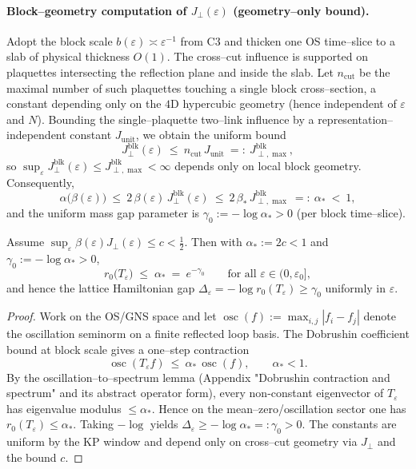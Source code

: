 \documentclass[11pt]{amsart}
\begin{document}
\paragraph{Block–geometry computation of $J_{\perp}(\varepsilon)$ (geometry–only bound).}
Adopt the block scale $b(\varepsilon)\asymp\varepsilon^{-1}$ from C3 and thicken one OS time–slice to a slab of physical thickness $O(1)$. The cross–cut influence is supported on plaquettes intersecting the reflection plane and inside the slab. Let $n_{\mathrm{cut}}$ be the maximal number of such plaquettes touching a single block cross–section, a constant depending only on the $4$D hypercubic geometry (hence independent of $\varepsilon$ and $N$). Bounding the single–plaquette two–link influence by a representation–independent constant $J_{\mathrm{unit}}$, we obtain the uniform bound
\[
  J^{\mathrm{blk}}_{\perp}(\varepsilon)\ \le\ n_{\mathrm{cut}}\,J_{\mathrm{unit}}\ =:\ J^{\mathrm{blk}}_{\perp,\max},
\]
so $\sup_{\varepsilon} J^{\mathrm{blk}}_{\perp}(\varepsilon)\le J^{\mathrm{blk}}_{\perp,\max}<\infty$ depends only on local block geometry. Consequently,
\[
  \alpha\bigl(\beta(\varepsilon)\bigr)\ \le\ 2\,\beta(\varepsilon)\,J^{\mathrm{blk}}_{\perp}(\varepsilon)\ \le\ 2\,\beta_*\,J^{\mathrm{blk}}_{\perp,\max}\ =:\ \alpha_*\ <\ 1,
\]
and the uniform mass gap parameter is $\gamma_0:=-\log \alpha_*>0$ (per block time–slice).

\begin{theorem}
Assume $\sup_{\varepsilon}\beta(\varepsilon) J_{\perp}(\varepsilon)\le c<\tfrac12$. Then with $\alpha_*:=2c<1$ and $\gamma_0:=-\log\alpha_*>0$,
\[
  r_0\bigl(T_{\varepsilon}\bigr)\;\le\;\alpha_*\ =\ e^{-\gamma_0}\qquad\text{for all }\varepsilon\in(0,\varepsilon_0],
\]
and hence the lattice Hamiltonian gap $\Delta_{\varepsilon}=-\log r_0(T_{\varepsilon})\ge \gamma_0$ uniformly in $\varepsilon$.
\end{theorem}

\begin{proof}[Proof]
Work on the OS/GNS space and let $\operatorname{osc}(f):=\max_{i,j}|f_i-f_j|$ denote the oscillation seminorm on a finite reflected loop basis. The Dobrushin coefficient bound at block scale gives a one–step contraction
\[
  \operatorname{osc}(T_{\varepsilon} f)\ \le\ \alpha_*\,\operatorname{osc}(f),\qquad \alpha_*<1.
\]
By the oscillation–to–spectrum lemma (Appendix "Dobrushin contraction and spectrum" and its abstract operator form), every non-constant eigenvector of $T_{\varepsilon}$ has eigenvalue modulus $\le \alpha_*$. Hence on the mean–zero/oscillation sector one has $r_0(T_{\varepsilon})\le \alpha_*$. Taking $-\log$ yields $\Delta_{\varepsilon}\ge -\log\alpha_*=:\gamma_0>0$. The constants are uniform by the KP window and depend only on cross–cut geometry via $J_{\perp}$ and the bound $c$.
\end{proof}
\end{document}
